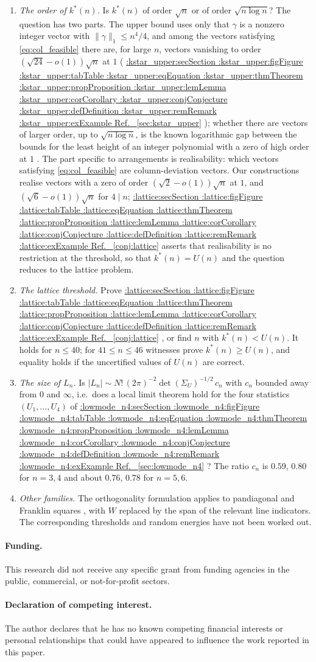 \documentclass[11pt,a4paper]{article}
\makeatletter
\def\Cref@getprefix#1:#2\relax{#1}
\def\Cref@prefix@sec{sec}
\def\Cref@prefix@fig{fig}
\def\Cref@prefix@tab{tab}
\def\Cref@prefix@eq{eq}
\def\Cref@prefix@thm{thm}
\def\Cref@prefix@prop{prop}
\def\Cref@prefix@lem{lem}
\def\Cref@prefix@cor{cor}
\def\Cref@prefix@conj{conj}
\def\Cref@prefix@def{def}
\def\Cref@prefix@rem{rem}
\def\Cref@prefix@ex{ex}
\def\Cref@type@cap#1{%
  \edef\Cref@tmp{#1}%
  \ifx\Cref@tmp\Cref@prefix@sec Section%
  \else\ifx\Cref@tmp\Cref@prefix@fig Figure%
  \else\ifx\Cref@tmp\Cref@prefix@tab Table%
  \else\ifx\Cref@tmp\Cref@prefix@eq Equation%
  \else\ifx\Cref@tmp\Cref@prefix@thm Theorem%
  \else\ifx\Cref@tmp\Cref@prefix@prop Proposition%
  \else\ifx\Cref@tmp\Cref@prefix@lem Lemma%
  \else\ifx\Cref@tmp\Cref@prefix@cor Corollary%
  \else\ifx\Cref@tmp\Cref@prefix@conj Conjecture%
  \else\ifx\Cref@tmp\Cref@prefix@def Definition%
  \else\ifx\Cref@tmp\Cref@prefix@rem Remark%
  \else\ifx\Cref@tmp\Cref@prefix@ex Example%
  \else Ref.%
  \fi\fi\fi\fi\fi\fi\fi\fi\fi\fi\fi\fi
}
\DeclareRobustCommand{\Cref}[1]{%
  \begingroup
  \edef\Cref@label{#1}%
  \edef\Cref@prefix{\expandafter\Cref@getprefix\Cref@label:\relax}%
  \hyperref[#1]{\Cref@type@cap{\Cref@prefix}~\ref*{#1}}%
  \endgroup
}
\theoremstyle{plain}
\theoremstyle{definition}
\theoremstyle{remark}
\makeatother
\begin{document}
\begin{enumerate}\setlength\itemsep{2pt}
\item \emph{The order of $k^*(n)$.} Is $k^*(n)$ of order $\sqrt n$ or of order $\sqrt{n\log n}$?
The question has two parts.
The upper bound uses only that $\gamma$ is a nonzero integer vector with $\|\gamma\|_1\le n^4/4$, and among the vectors satisfying \eqref{eq:col_feasible} there are, for large $n$, vectors vanishing to order $(\sqrt{24}-o(1))\sqrt n$ at $1$ (\Cref{sec:kstar_upper}); whether there are vectors of larger order, up to $\sqrt{n\log n}$, is the known logarithmic gap between the bounds for the least height of an integer polynomial with a zero of high order at $1$ \cite{mignotte1982,bombieri1987low,amoroso1995}.
The part specific to arrangements is realisability: which vectors satisfying \eqref{eq:col_feasible} are column-deviation vectors.
Our constructions realise vectors with a zero of order $(\sqrt2-o(1))\sqrt n$ at $1$, and $(\sqrt6-o(1))\sqrt n$ for $4\mid n$; \Cref{conj:lattice} asserts that realisability is no restriction at the threshold, so that $k^*(n)=U(n)$ and the question reduces to the lattice problem.
\item \emph{The lattice threshold.} Prove \Cref{conj:lattice}, or find $n$ with $k^*(n)<U(n)$.  It holds for $n\le40$; for $41\le n\le46$ witnesses prove $k^*(n)\ge U(n)$, and equality holds if the uncertified values of $U(n)$ are correct.
\item \emph{The size of $L_n$.} Is $|L_n|\sim N!\,(2\pi)^{-2}\det(\Sigma_U)^{-1/2}\,c_n$ with $c_n$ bounded away from $0$ and $\infty$, i.e.\ does a local limit theorem hold for the four statistics $(U_1,\dots,U_4)$ of \Cref{sec:lowmode_n4}?  The ratio $c_n$ is $0.59$, $0.80$ for $n=3,4$ and about $0.76$, $0.78$ for $n=5,6$.
\item \emph{Other families.} The orthogonality formulation applies to pandiagonal and Franklin squares \cite{loly2007franklin}, with $W$ replaced by the span of the relevant line indicators.  The corresponding thresholds and random energies have not been worked out.
\end{enumerate}


\paragraph{Funding.} This research did not receive any specific grant from funding agencies in the public, commercial, or not-for-profit sectors.

\paragraph{Declaration of competing interest.} The author declares that he has no known competing financial interests or personal relationships that could have appeared to influence the work reported in this paper.
\end{document}
